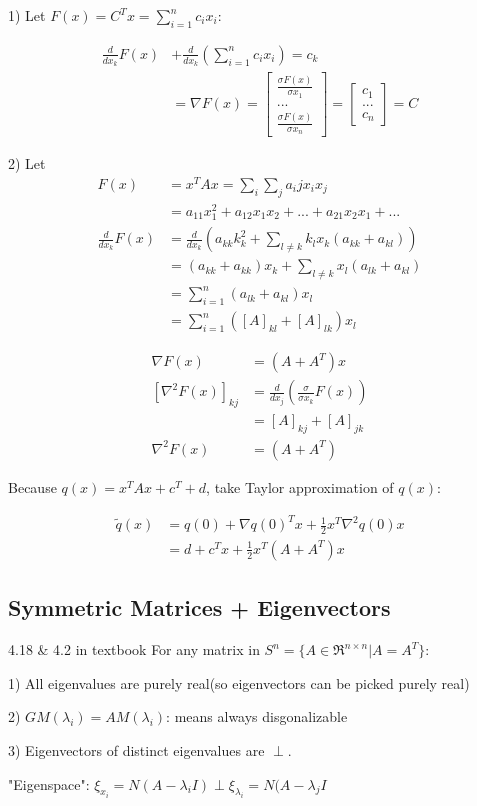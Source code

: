 1) Let $F(x) = C^Tx = \sum^n_{i=1}c_ix_i$:

\begin{align*}
\frac{d}{dx_k}F(x) &+ \frac{d}{dx_k}(\sum^n_{i=1}c_ix_i) = c_k\\
&= \nabla F(x) = 
\begin{bmatrix}%
\frac{\sigma F(x)}{\sigma x_1}\\
...\\
\frac{\sigma F(x)}{\sigma x_n}
\end{bmatrix}=
\begin{bmatrix}%
c_1\\
...\\
c_n
\end{bmatrix} = C
\end{align*}

2) Let
\begin{align*}
F(x) &= x^TAx = \sum_i\sum_ja_ijx_ix_j\\
&= a_{11}x_1^2 + a_{12}x_1x_2 + ... + a_{21}x_2x_1 + ...\\
\frac{d}{dx_k}F(x) &= \frac{d}{dx_k}(a_{kk}k_k^2 + \sum_{l\neq k}k_lx_k(a_{kk}+a_{kl}))\\
&= (a_{kk} + a_{kk})x_k + \sum_{l\neq k}x_l(a_{lk} + a_{kl}) \\
&= \sum^n_{i=1}(a_{lk} + a_{kl})x_l\\
&= \sum^n_{i=1}([A]_{kl} + [A]_{lk})x_l
\end{align*}

\begin{align*}
\nabla F(x) &= (A + A^T)x\\
[\nabla^2F(x)]_{kj} &= \frac{d}{dx_j}(\frac{\sigma}{\sigma x_k}F(x))\\
&= [A]_{kj} + [A]_{jk}\\
\nabla^2F(x) &= (A + A^T)
\end{align*}

Because $q(x) = x^TAx + c^T + d$, take Taylor approximation of $q(x)$:

\begin{align*}
\tilde{q}(x) &= q(0) + \nabla q(0)^Tx + \frac{1}{2}x^T\nabla^2q(0)x\\
&= d + c^Tx + \frac{1}{2}x^T(A + A^T)x
\end{align*}

\subsection{Symmetric Matrices + Eigenvectors}

\begin{theorem}{4.18 \& 4.2 in textbook}
	For any matrix in $S^n = \{A\in \Re^{n\times n} | A = A^T \}$:
	
	1) All eigenvalues are purely real(so eigenvectors can be picked purely real)
	
	2) $GM(\lambda_i) = AM(\lambda_i)$: means always disgonalizable
	
	3) Eigenvectors of distinct eigenvalues are $\perp$.
	
	"Eigenspace": $\xi_{x_i} = N(A - \lambda_iI)\perp \xi_{\lambda_i} = N(A - \lambda_jI$
\end{theorem}

